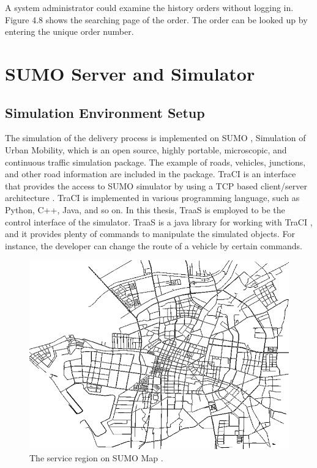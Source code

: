 \documentclass[12pt]{ksthesis}
\begin{document}
\begin{thesis}
{A system administrator could examine the history orders without logging in. Figure 4.8 shows the searching page of the order. The order can be looked up by entering the unique order number. 




\section{SUMO Server and Simulator}

\subsection{Simulation Environment Setup}

The simulation of the delivery process is implemented on SUMO \cite{behrisch2011sumo}, Simulation of Urban Mobility, which is an open source, highly portable, microscopic, and continuous traffic simulation package. The example of roads, vehicles, junctions, and other road information are included in the package. TraCI is an interface that provides the access to SUMO simulator by using a TCP based client/server architecture \cite{wegener2008traci}. TraCI is implemented in various programming language, such as Python, C++, Java, and so on. In this thesis, TraaS is employed to be the control interface of the simulator. TraaS is a java library for working with TraCI , and it provides plenty of commands to manipulate the simulated objects. For instance, the developer can change the route of a vehicle by certain commands.

\begin{figure}[H]
\centering
\includegraphics[width=1.0\textwidth]{./figures/F4-9-SUMOMap.PNG}
\caption{\large The service region on SUMO Map .}
\vspace{0.5cm}
\label{Fig:SUMOMap}
\end{figure}



}
\end{thesis}
\end{document}
